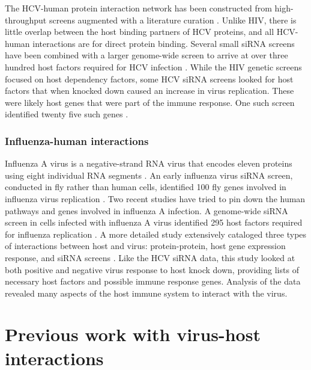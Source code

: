 The HCV-human protein interaction network has been constructed from
high-throughput screens augmented with a literature curation
\cite{dechassey08}. Unlike HIV, there is little overlap between the
host binding partners of HCV proteins, and all HCV-human interactions
are for direct protein binding. Several small siRNA screens have been
combined with a larger genome-wide screen to arrive at over three
hundred host factors required for HCV infection \cite{Li09}. While the
HIV genetic screens focused on host dependency factors, some HCV siRNA
screens looked for host factors that when knocked down caused an
increase in virus replication. These were likely host genes that were
part of the immune response. One such screen identified twenty five
such genes \cite{Li09}.

\subsubsection{Influenza-human interactions}

Influenza A virus is a negative-strand RNA virus that encodes eleven
proteins using eight individual RNA segments
\cite{clancy2008genetics}.  An early influenza virus siRNA screen,
conducted in fly rather than human cells, identified 100 fly genes
involved in influenza virus replication \cite{hao2008drosophila}. Two
recent studies have tried to pin down the human pathways and genes
involved in influenza A infection. A genome-wide siRNA screen in cells
infected with influenza A virus identified 295 host factors required
for influenza replication \cite{konig2009human}. A more detailed study
extensively cataloged three types of interactions between host and
virus: protein-protein, host gene expression response, and siRNA
screens \cite{shapira2009physical}. Like the HCV siRNA data, this
study looked at both positive and negative virus response to host
knock down, providing lists of necessary host factors and possible
immune response genes. Analysis of the data revealed many aspects of
the host immune system to interact with the virus.

\section{Previous work with virus-host interactions}

